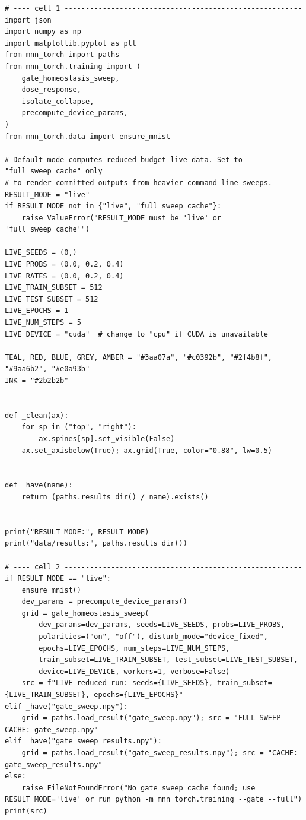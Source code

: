 \begin{lstlisting}[caption={experiments/homeostasis.ipynb},label={lst:mnn-nb-homeostasis}]
# ---- cell 1 --------------------------------------------------------
import json
import numpy as np
import matplotlib.pyplot as plt
from mnn_torch import paths
from mnn_torch.training import (
    gate_homeostasis_sweep,
    dose_response,
    isolate_collapse,
    precompute_device_params,
)
from mnn_torch.data import ensure_mnist

# Default mode computes reduced-budget live data. Set to "full_sweep_cache" only
# to render committed outputs from heavier command-line sweeps.
RESULT_MODE = "live"
if RESULT_MODE not in {"live", "full_sweep_cache"}:
    raise ValueError("RESULT_MODE must be 'live' or 'full_sweep_cache'")

LIVE_SEEDS = (0,)
LIVE_PROBS = (0.0, 0.2, 0.4)
LIVE_RATES = (0.0, 0.2, 0.4)
LIVE_TRAIN_SUBSET = 512
LIVE_TEST_SUBSET = 512
LIVE_EPOCHS = 1
LIVE_NUM_STEPS = 5
LIVE_DEVICE = "cuda"  # change to "cpu" if CUDA is unavailable

TEAL, RED, BLUE, GREY, AMBER = "#3aa07a", "#c0392b", "#2f4b8f", "#9aa6b2", "#e0a93b"
INK = "#2b2b2b"


def _clean(ax):
    for sp in ("top", "right"):
        ax.spines[sp].set_visible(False)
    ax.set_axisbelow(True); ax.grid(True, color="0.88", lw=0.5)


def _have(name):
    return (paths.results_dir() / name).exists()


print("RESULT_MODE:", RESULT_MODE)
print("data/results:", paths.results_dir())

# ---- cell 2 --------------------------------------------------------
if RESULT_MODE == "live":
    ensure_mnist()
    dev_params = precompute_device_params()
    grid = gate_homeostasis_sweep(
        dev_params=dev_params, seeds=LIVE_SEEDS, probs=LIVE_PROBS,
        polarities=("on", "off"), disturb_mode="device_fixed",
        epochs=LIVE_EPOCHS, num_steps=LIVE_NUM_STEPS,
        train_subset=LIVE_TRAIN_SUBSET, test_subset=LIVE_TEST_SUBSET,
        device=LIVE_DEVICE, workers=1, verbose=False)
    src = f"LIVE reduced run: seeds={LIVE_SEEDS}, train_subset={LIVE_TRAIN_SUBSET}, epochs={LIVE_EPOCHS}"
elif _have("gate_sweep.npy"):
    grid = paths.load_result("gate_sweep.npy"); src = "FULL-SWEEP CACHE: gate_sweep.npy"
elif _have("gate_sweep_results.npy"):
    grid = paths.load_result("gate_sweep_results.npy"); src = "CACHE: gate_sweep_results.npy"
else:
    raise FileNotFoundError("No gate sweep cache found; use RESULT_MODE='live' or run python -m mnn_torch.training --gate --full")
print(src)


\end{lstlisting}
